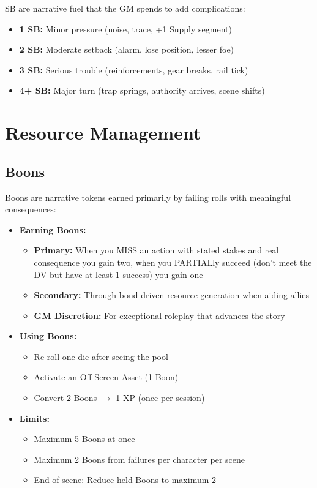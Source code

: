 \documentclass[11pt]{article}
\begin{document}
SB are narrative fuel that the GM spends to add complications:
\begin{itemize}
\item \textbf{1 SB:} Minor pressure (noise, trace, +1 Supply segment)
\item \textbf{2 SB:} Moderate setback (alarm, lose position, lesser foe)
\item \textbf{3 SB:} Serious trouble (reinforcements, gear breaks, rail tick)
\item \textbf{4+ SB:} Major turn (trap springs, authority arrives, scene shifts)
\end{itemize}

\section{Resource Management}

\subsection{Boons}

Boons are narrative tokens earned primarily by failing rolls with meaningful consequences:

\begin{itemize}
\item \textbf{Earning Boons:}
   \begin{itemize}
	   \item \textbf{Primary:} When you MISS an action with stated stakes and real consequence you gain two, when you PARTIALly succeed (don't meet the DV but have at least 1 success) you gain one
   \item \textbf{Secondary:} Through bond-driven resource generation when aiding allies
   \item \textbf{GM Discretion:} For exceptional roleplay that advances the story
   \end{itemize}
\item \textbf{Using Boons:}
   \begin{itemize}
   \item Re-roll one die after seeing the pool
   \item Activate an Off-Screen Asset (1 Boon)
   \item Convert 2 Boons $\rightarrow$ 1 XP (once per session)
   \end{itemize}
\item \textbf{Limits:}
   \begin{itemize}
   \item Maximum 5 Boons at once
   \item Maximum 2 Boons from failures per character per scene
   \item End of scene: Reduce held Boons to maximum 2
   \end{itemize}
\end{itemize}
\end{document}
